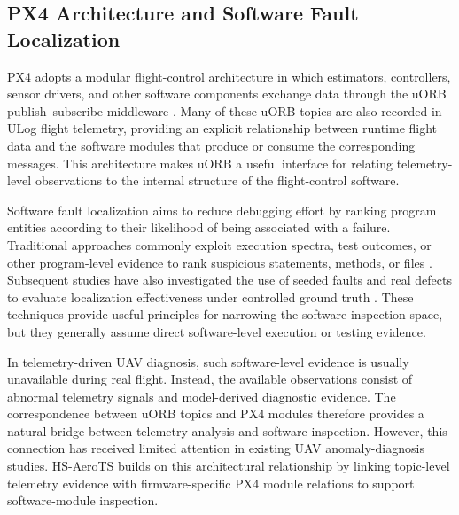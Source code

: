 \subsection{PX4 Architecture and Software Fault Localization}

PX4 adopts a modular flight-control architecture in which estimators, controllers, sensor drivers, and other software components exchange data through the uORB publish--subscribe middleware \cite{meier2015px4,px4uorbdocs2026}. Many of these uORB topics are also recorded in ULog flight telemetry, providing an explicit relationship between runtime flight data and the software modules that produce or consume the corresponding messages. This architecture makes uORB a useful interface for relating telemetry-level observations to the internal structure of the flight-control software.

Software fault localization aims to reduce debugging effort by ranking program entities according to their likelihood of being associated with a failure. Traditional approaches commonly exploit execution spectra, test outcomes, or other program-level evidence to rank suspicious statements, methods, or files \cite{wong2016survey,jones2002visualization}. Subsequent studies have also investigated the use of seeded faults and real defects to evaluate localization effectiveness under controlled ground truth \cite{pearson2017evaluating,papadakis2019mutation}. These techniques provide useful principles for narrowing the software inspection space, but they generally assume direct software-level execution or testing evidence.

In telemetry-driven UAV diagnosis, such software-level evidence is usually unavailable during real flight. Instead, the available observations consist of abnormal telemetry signals and model-derived diagnostic evidence. The correspondence between uORB topics and PX4 modules therefore provides a natural bridge between telemetry analysis and software inspection. However, this connection has received limited attention in existing UAV anomaly-diagnosis studies. HS-AeroTS builds on this architectural relationship by linking topic-level telemetry evidence with firmware-specific PX4 module relations to support software-module inspection.
